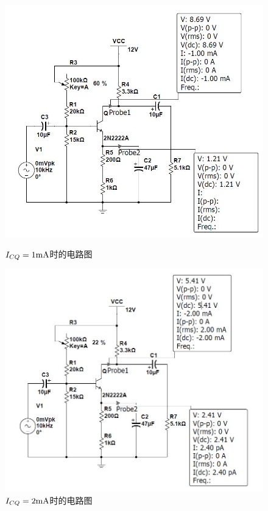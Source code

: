 \documentclass[UTF8,a4paper]{ctexart}
\begin{document}
\begin{figure}
\centering
\includegraphics[width=\textwidth]{1.jpg}
\caption{$I_{CQ}=1\rm{mA}$时的电路图}
\label{1}
\includegraphics[width=\textwidth]{2.jpg}
\caption{$I_{CQ}=2\rm{mA}$时的电路图}
\label{2}
\end{figure}
\end{document}
